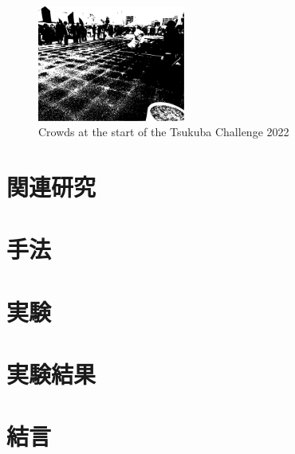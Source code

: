 \documentclass{jarticle}
\begin{document}
\begin{figure}[h]
  \centering
   \includegraphics[height=38mm]{fig/hitogomi.eps}
   \vspace*{-4mm}
   \caption{Crowds at the start of the Tsukuba Challenge 2022}
   \label{fig: つくばチャレンジ人混み}
 \end{figure}

\section{関連研究}%

\section{手法}%


\section{実験}%

\section{実験結果}%

\section{結言}%


\footnotesize
\begin{thebibliography}{99}




\end{thebibliography}

\normalsize
\end{document}
